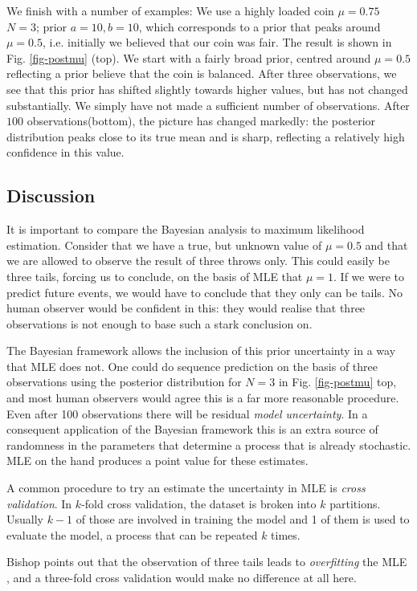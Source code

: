 We finish  with  a number of examples:
We use a highly loaded coin $\mu = 0.75$ $N=3$; prior $a=10, b= 10$, which corresponds to a prior that peaks around $\mu = 0.5$, i.e. initially we believed that our coin was
fair. The result is shown in Fig. \ref{fig-postmu} (top). We start with a fairly broad prior, centred around $\mu = 0.5$ reflecting a prior believe that the coin is balanced.
After three observations, we see that this prior has shifted slightly towards higher values, but has not changed substantially. We simply have not made a sufficient number
of observations. After $100$ observations(bottom), the picture has changed markedly: the posterior distribution peaks close to its true mean and is sharp, reflecting
a relatively high confidence in this value.

\subsection{Discussion}
It is important to compare the Bayesian analysis to maximum likelihood estimation. Consider that we have a true, but unknown value of $\mu = 0.5$ and that we are allowed to
observe the result of three throws only. This could easily be three tails, forcing us to conclude, on the basis of MLE that $\mu =1$. If we were to predict future
events, we would have to conclude that they only can be tails. No human observer would be confident in this: they would realise that three observations is not enough to base
such a stark conclusion on.

The Bayesian framework allows the inclusion of this prior uncertainty in a way that MLE does not. One could do sequence prediction on the basis of three observations
using the posterior distribution for $N=3$ in Fig. \ref{fig-postmu} top, and most human observers would agree this is a far more reasonable procedure. Even after 100 observations
there will be residual \emph{model uncertainty}. In a consequent application of the Bayesian framework this is an extra source of randomness in the parameters that determine
a process that is already stochastic. MLE on the hand produces a point value for these estimates.

A common procedure to try an estimate the uncertainty in MLE is \emph{cross validation}. In $k$-fold cross validation, the dataset is broken into $k$ partitions. Usually $k-1$
of those are involved in training the model and 1 of them is used to evaluate the model, a process that can be repeated $k$ times.

Bishop points out that the observation of three tails leads to \emph{overfitting} the MLE \cite{bishop2006}, and a three-fold cross validation would make no difference at all here.

